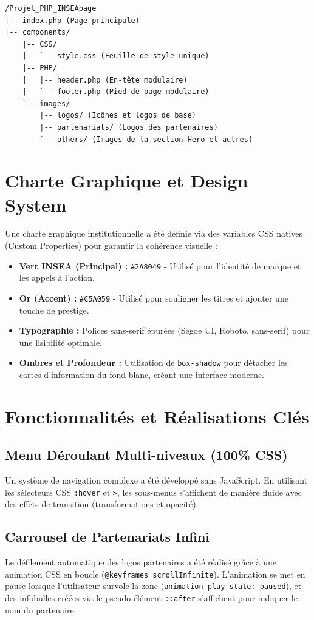 \documentclass[12pt,a4paper]{article}
\begin{document}
\begin{verbatim}
/Projet_PHP_INSEApage
|-- index.php (Page principale)
|-- components/
    |-- CSS/
    |   `-- style.css (Feuille de style unique)
    |-- PHP/
    |   |-- header.php (En-tête modulaire)
    |   `-- footer.php (Pied de page modulaire)
    `-- images/
        |-- logos/ (Icônes et logos de base)
        |-- partenariats/ (Logos des partenaires)
        `-- others/ (Images de la section Hero et autres)
\end{verbatim}

\section{Charte Graphique et Design System}
Une charte graphique institutionnelle a été définie via des variables CSS natives (Custom Properties) pour garantir la cohérence visuelle :
\begin{itemize}
    \item \textbf{Vert INSEA (Principal) :} \texttt{\#2A8049} - Utilisé pour l'identité de marque et les appels à l'action.
    \item \textbf{Or (Accent) :} \texttt{\#C5A059} - Utilisé pour souligner les titres et ajouter une touche de prestige.
    \item \textbf{Typographie :} Polices sans-serif épurées (Segoe UI, Roboto, sans-serif) pour une lisibilité optimale.
    \item \textbf{Ombres et Profondeur :} Utilisation de \texttt{box-shadow} pour détacher les cartes d'information du fond blanc, créant une interface moderne.
\end{itemize}

\section{Fonctionnalités et Réalisations Clés}

\subsection{Menu Déroulant Multi-niveaux (100\% CSS)}
Un système de navigation complexe a été développé sans JavaScript. En utilisant les sélecteurs CSS \texttt{:hover} et \texttt{>}, les sous-menus s'affichent de manière fluide avec des effets de transition (transformations et opacité).

\subsection{Carrousel de Partenariats Infini}
Le défilement automatique des logos partenaires a été réalisé grâce à une animation CSS en boucle (\texttt{@keyframes scrollInfinite}). L'animation se met en pause lorsque l'utilisateur survole la zone (\texttt{animation-play-state: paused}), et des infobulles créées via le pseudo-élément \texttt{::after} s'affichent pour indiquer le nom du partenaire.
\end{document}
